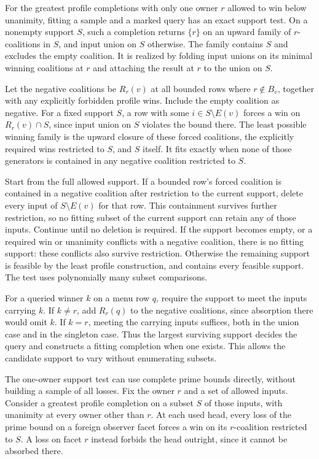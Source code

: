 For the greatest profile completions with only one owner
$r$ allowed to win below unanimity, fitting a sample and
a marked query has an exact support test. On a nonempty
support $S$, such a completion returns $\{r\}$ on an upward
family of $r$-coalitions in $S$, and input union on $S$
otherwise. The family contains $S$ and excludes the empty
coalition. It is realized by folding input unions on its
minimal winning coalitions at $r$ and attaching the
result at $r$ to the union on $S$.

Let the negative coalitions be $R_r(v)$ at all bounded rows
where $r\notin B_v$, together with any explicitly forbidden
profile wins. Include the empty coalition as negative.
For a fixed support $S$, a row with some
$i\in S\setminus E(v)$ forces a win on $R_r(v)\cap S$,
since input union on $S$ violates the bound there.
The least possible winning family is the upward closure
of these forced coalitions, the explicitly required wins
restricted to $S$, and $S$ itself. It fits exactly when
none of those generators is contained in any negative
coalition restricted to $S$.

Start from the full allowed support. If a bounded row's
forced coalition is contained in a negative coalition
after restriction to the current support, delete every
input of $S\setminus E(v)$ for that row. This containment
survives further restriction, so no fitting subset of
the current support can retain any of those inputs.
Continue until no deletion is required. If the support
becomes empty, or a required win or unanimity conflicts
with a negative coalition, there is no fitting support:
these conflicts also survive restriction. Otherwise the
remaining support is feasible by the least profile
construction, and contains every feasible support.
The test uses polynomially many subset comparisons.

For a queried winner $k$ on a menu row $q$, require the
support to meet the inputs carrying $k$. If $k\ne r$,
add $R_r(q)$ to the negative coalitions, since absorption
there would omit $k$. If $k=r$, meeting the carrying
inputs suffices, both in the union case and in the
singleton case. Thus the largest surviving support
decides the query and constructs a fitting completion
when one exists. This allows the candidate support to
vary without enumerating subsets.

The one-owner support test can use complete prime bounds
directly, without building a sample of all losses. Fix
the owner $r$ and a set of allowed inputs. Consider a
greatest profile completion on a subset $S$ of those
inputs, with unanimity at every owner other than $r$.
At each used head, every loss of the prime bound on a
foreign observer facet forces a win on its $r$-coalition
restricted to $S$. A loss on facet $r$ instead forbids
the head outright, since it cannot be absorbed there.


